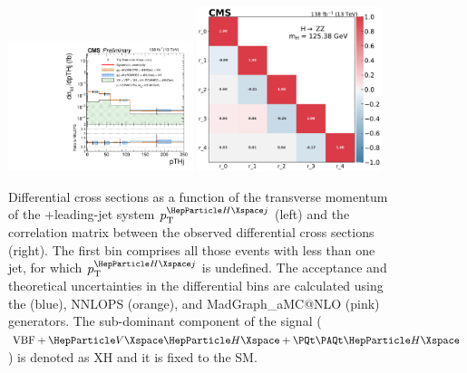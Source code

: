 \begin{center}
	\begin{figure}[!htb]
		\centering
		\includegraphics[width=0.48\textwidth]{Images/H4L/pTHj_unfoldwith_SM_125_logscale_asimov.pdf}
		\includegraphics[width=0.48\textwidth]{Images/H4L/correlations/corr_pTHj_v3.pdf}\\
		\caption{
			Differential cross sections as a function of the transverse momentum of the \PH+leading-jet system $\pt^{\PH j}$ (left) and the correlation matrix between the observed differential cross sections (right).
			The first bin comprises all those events with less than one jet, for which $\pt^{\PH j}$  is undefined.
			The acceptance and theoretical uncertainties in the differential bins are calculated using the \POWHEG (blue), NNLOPS (orange), and MadGraph\_aMC@NLO (pink) generators.
			The sub-dominant component of the signal ($\VBF + \VH + \ttH$) is denoted as XH and it is fixed to the SM.
			\label{fig:fidPTHJ}}
	\end{figure}
\end{center}

\clearpage



